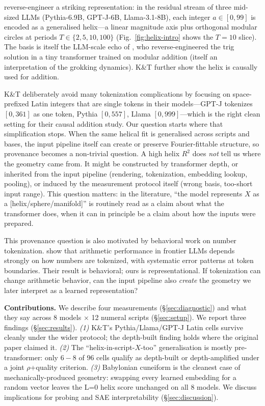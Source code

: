\documentclass[10pt,letterpaper]{article}
\begin{document}
\citet{kantamneni2025helix} reverse-engineer a striking representation:
in the residual stream of three mid-sized LLMs (Pythia-6.9B, GPT-J-6B,
Llama-3.1-8B), each integer $a \in [0,99]$ is encoded as a generalised
helix---a linear magnitude axis plus orthogonal modular circles at
periods $T \in \{2, 5, 10, 100\}$ (Fig.~\ref{fig:helix-intro} shows the
$T=10$ slice). The basis is itself the LLM-scale echo of
\citet{nanda2023progress}, who reverse-engineered the trig solution
in a tiny transformer trained on modular addition (itself an
interpretation of the \citet{power2022grokking} grokking dynamics).
K\&T further show the helix is causally used for addition.

K\&T deliberately avoid many tokenization complications by focusing
on space-prefixed Latin integers that are single tokens in their
models---GPT-J tokenizes $[0, 361]$ as one token, Pythia $[0, 557]$,
Llama $[0, 999]$---which is the right clean setting for their causal
addition study. Our question starts where that simplification stops.
When the same helical fit is generalised across scripts and bases,
the input pipeline itself can create or preserve Fourier-fittable
structure, so provenance becomes a non-trivial question. A high
helix $R^2$ does \emph{not} tell us where the geometry came from. It
might be constructed by transformer depth, or inherited from the
input pipeline (rendering, tokenization, embedding lookup, pooling),
or induced by the measurement protocol itself (wrong basis, too-short
input range). This question matters: in the literature, ``the model
represents $X$ as a [helix/sphere/manifold]'' is routinely read as a
claim about what the transformer does, when it can in principle be a
claim about how the inputs were prepared.

This provenance question is also motivated by behavioral work on
number tokenization. \citet{singh2024tokenization} show that
arithmetic performance in frontier LLMs depends strongly on how
numbers are tokenized, with systematic error patterns at token
boundaries. Their result is behavioral; ours is representational.
If tokenization can change arithmetic behavior, can the input
pipeline also \emph{create} the geometry we later interpret as a
learned representation?

\textbf{Contributions.} We describe four measurements
(\S\ref{sec:diagnostic}) and what they say across 8 models $\times$ 12
numeral scripts (\S\ref{sec:setup}). We report three findings
(\S\ref{sec:results}). \emph{(1)} K\&T's Pythia/Llama/GPT-J Latin
cells survive cleanly under the wider protocol; the depth-built
finding holds where the original paper claimed it. \emph{(2)} The
``helix-in-script-$X$-too'' generalisation is mostly pre-transformer:
only $6{-}8$ of $96$ cells qualify as depth-built or depth-amplified
under a joint $\rho$+quality criterion. \emph{(3)} Babylonian
cuneiform is the cleanest case of mechanically-produced geometry:
swapping every learned embedding for a random vector leaves the L=0
helix score unchanged on all 8 models. We discuss implications for
probing and SAE interpretability (\S\ref{sec:discussion}).
\end{document}
